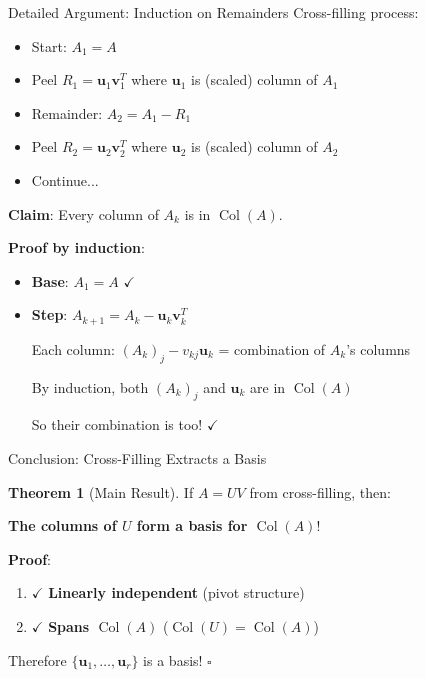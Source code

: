 \documentclass[10pt]{beamer}
\theoremstyle{definition}
\newtheorem{thm}{Theorem}[section]
\newcommand{\x}[1]{\alert{\textbf{#1}}}
\begin{document}
\begin{frame}{Detailed Argument: Induction on Remainders}
Cross-filling process:
\begin{itemize}
\item Start: $A_1 = A$
\item Peel $R_1 = \mathbf{u}_1\mathbf{v}_1^T$ where $\mathbf{u}_1$ is (scaled) column of $A_1$
\item Remainder: $A_2 = A_1 - R_1$
\item Peel $R_2 = \mathbf{u}_2\mathbf{v}_2^T$ where $\mathbf{u}_2$ is (scaled) column of $A_2$
\item Continue...
\end{itemize}

\vfill
\x{Claim}: Every column of $A_k$ is in $\operatorname{Col}(A)$.

\textbf{Proof by induction}:
\begin{itemize}
\item \x{Base}: $A_1 = A$ $\checkmark$
\item \x{Step}: $A_{k+1} = A_k - \mathbf{u}_k\mathbf{v}_k^T$

Each column: $(A_k)_j - v_{kj}\mathbf{u}_k$ = combination of $A_k$'s columns

By induction, both $(A_k)_j$ and $\mathbf{u}_k$ are in $\operatorname{Col}(A)$

So their combination is too! $\checkmark$
\end{itemize}
\end{frame}

\begin{frame}{Conclusion: Cross-Filling Extracts a Basis}
\begin{thm}[Main Result]
If $A = UV$ from cross-filling, then:

\x{The columns of $U$ form a basis for $\operatorname{Col}(A)$}!
\end{thm}

\vfill
\textbf{Proof}:
\begin{enumerate}
\item $\checkmark$ \x{Linearly independent} (pivot structure)
\item $\checkmark$ \x{Spans $\operatorname{Col}(A)$} ($\operatorname{Col}(U) = \operatorname{Col}(A)$)
\end{enumerate}

Therefore $\{\mathbf{u}_1, \ldots, \mathbf{u}_r\}$ is a basis! $\square$
\end{frame}

\end{document}

